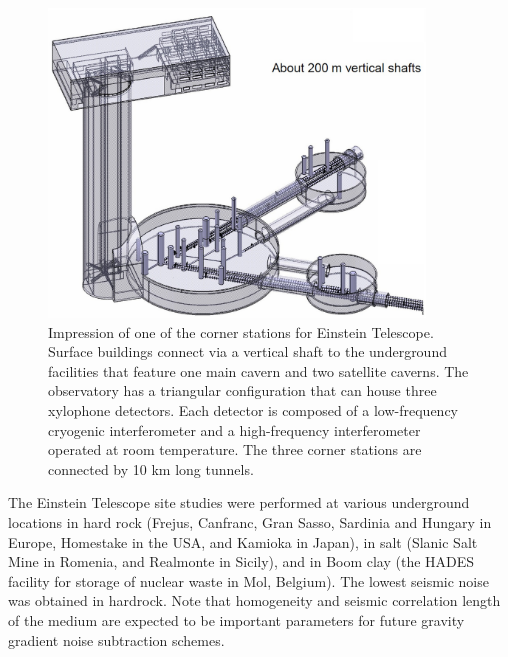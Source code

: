 \begin{figure}[htbp!]
	\centering
		\includegraphics[width=10cm]{./Sec_SiteInfra/Figures/infra.jpg}
		\caption{Impression of one of the corner stations for Einstein Telescope. Surface buildings connect via a vertical shaft to the underground facilities that feature one main cavern and two satellite caverns. The observatory has a triangular configuration that can house three xylophone detectors. Each detector is composed of a low-frequency cryogenic interferometer and a high-frequency interferometer operated at room temperature. The three corner stations are connected by 10 km long tunnels.}
		\label{fig:infra}
\end{figure}

The Einstein Telescope site studies were performed at various underground locations in hard rock (Frejus, Canfranc, Gran Sasso, Sardinia and Hungary in Europe, Homestake in the USA, and Kamioka in Japan), in salt (Slanic Salt Mine in Romenia, and Realmonte in Sicily), and in Boom clay (the HADES facility for storage of nuclear waste in Mol, Belgium). The lowest seismic noise was obtained in hardrock. Note that homogeneity and seismic correlation length of the medium are expected to be important parameters for future gravity gradient noise subtraction schemes.

